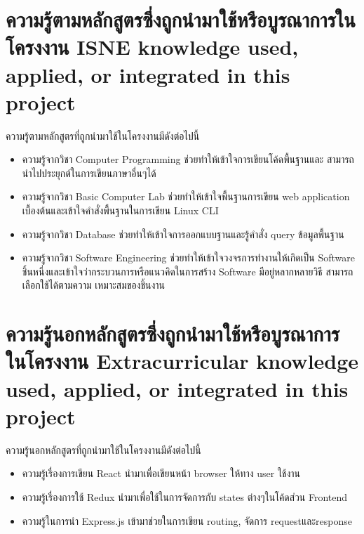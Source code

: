 




\section{\ifcpe%
ความรู้ตามหลักสูตรซึ่งถูกนำมาใช้หรือบูรณาการในโครงงาน
\else%
ISNE knowledge used, applied, or integrated in this project
\fi
}

ความรู้ตามหลักสูตรที่ถูกนำมาใช้ในโครงงานมีดังต่อไปนี้
\begin{itemize}
  \item ความรู้จากวิชา Computer Programming ช่วยทำให้เข้าใจการเขียนโค้ดพื้นฐานและ สามารถนำไปประยุกต์ในการเขียนภาษาอื่นๆได้
  \item ความรู้จากวิชา Basic Computer Lab ช่วยทำให้เข้าใจพื้นฐานการเขียน web application เบื้องต้นและเข้าใจคำสั่งพื้นฐานในการเขียน Linux CLI
  \item ความรู้จากวิชา Database ช่วยทำให้เข้าใจการออกแบบฐานและรู้คำสั่ง query ข้อมูลพื้นฐาน
  \item ความรู้จากวิชา Software Engineering ช่วยทำให้เข้าใจวงจรการทำงานให้เกิดเป็น Software ชิ้นหนึ่งและเข้าใจว่ากระบวนการหรือแนวคิดในการสร้าง Software มีอยู่หลากหลายวิธี สามารถเลือกใช้ได้ตามความ
  เหมาะสมของชิ้นงาน 
  
\end{itemize}


\section{\ifcpe%
ความรู้นอกหลักสูตรซึ่งถูกนำมาใช้หรือบูรณาการในโครงงาน
\else%
Extracurricular knowledge used, applied, or integrated in this project
\fi
}

ความรู้นอกหลักสูตรที่ถูกนำมาใช้ในโครงงานมีดังต่อไปนี้
\begin{itemize}
  \item ความรู้เรื่องการเขียน React นำมาเพื่อเขียนหน้า browser ให้ทาง user ใช้งาน
  \item ความรู้เรื่องการใช้ Redux นำมาเพื่อใช้ในการจัดการกับ states ต่างๆในโค้ดส่วน Frontend
  \item ความรู้ในการนำ Express.js เข้ามาช่วยในการเขียน routing, จัดการ requestและresponse
\end{itemize}
